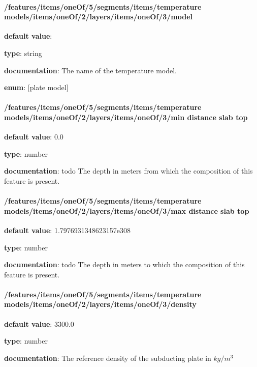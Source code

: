 \paragraph{/features/items/oneOf/5/segments/items/temperature models/items/oneOf/2/layers/items/oneOf/3/model} \begin{itemized}
\item {\bf default value}: 
\item {\bf type}: string
\item {\bf documentation}: The name of the temperature model.
\item {\bf enum}: [plate model]\end{itemized}\paragraph{/features/items/oneOf/5/segments/items/temperature models/items/oneOf/2/layers/items/oneOf/3/min distance slab top} \begin{itemized}
\item {\bf default value}: 0.0
\item {\bf type}: number
\item {\bf documentation}: todo The depth in meters from which the composition of this feature is present.
\end{itemized}\paragraph{/features/items/oneOf/5/segments/items/temperature models/items/oneOf/2/layers/items/oneOf/3/max distance slab top} \begin{itemized}
\item {\bf default value}: 1.7976931348623157e308
\item {\bf type}: number
\item {\bf documentation}: todo The depth in meters to which the composition of this feature is present.
\end{itemized}\paragraph{/features/items/oneOf/5/segments/items/temperature models/items/oneOf/2/layers/items/oneOf/3/density} \begin{itemized}
\item {\bf default value}: 3300.0
\item {\bf type}: number
\item {\bf documentation}: The reference density of the subducting plate in $kg/m^3$

\end{itemized}
